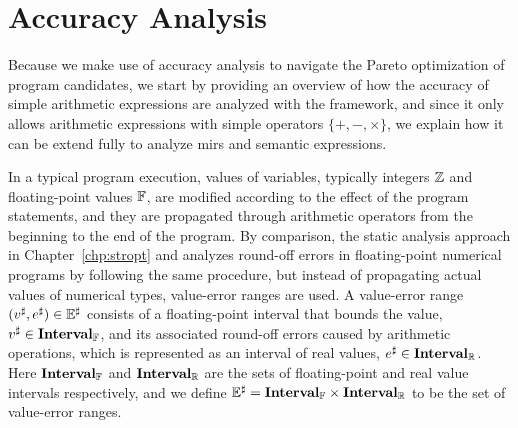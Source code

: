 \section{Accuracy Analysis}
\label{po:sec:accuracy_analysis}

Because we make use of accuracy analysis to navigate the Pareto optimization
of program candidates, we start by providing an overview of how the accuracy
of simple arithmetic expressions are analyzed with the \soap{} framework, and
since it only allows arithmetic expressions with simple operators $\{+, -,
\times\}$, we explain how it can be extend fully to analyze \glspl{mir} and
semantic expressions.

In a typical program execution, values of variables, typically integers
$\mathbb{Z}$ and floating-point values $\mathbb{F}$, are modified according
to the effect of the program statements, and they are propagated through
arithmetic operators from the beginning to the end of the program.  By
comparison, the static analysis approach in Chapter~\ref{chp:stropt} and
\cite{martel07} analyzes round-off errors in floating-point numerical
programs by following the same procedure, but instead of propagating actual
values of numerical types, value-error ranges are used.  A value-error range
$(v^\sharp, e^\sharp) \in \mathbb{E}^\sharp$ consists of a floating-point interval that
bounds the value, $v^\sharp \in \mathbf{Interval}_\mathbb{F}$, and its associated
round-off errors caused by arithmetic operations, which is represented as
an interval of real values, $e^\sharp \in \mathbf{Interval}_\mathbb{R}$.  Here
$\mathbf{Interval}_\mathbb{F}$ and $\mathbf{Interval}_\mathbb{R}$ are the sets of
floating-point and real value intervals respectively, and we define $\mathbb{E}^\sharp
= \mathbf{Interval}_\mathbb{F} \times \mathbf{Interval}_\mathbb{R}$ to be the set of
value-error ranges.

